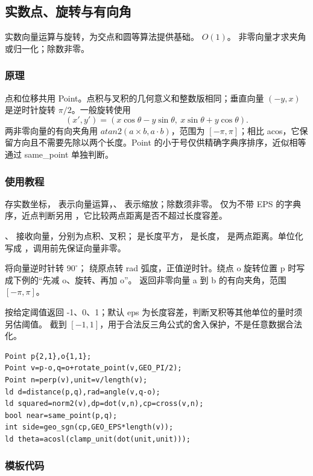 \subsection{实数点、旋转与有向角}
\label{geo:point}
\AlgorithmInfo
    {实数向量运算与旋转，为交点和圆等算法提供基础。}
    {$O(1)$。}
    {非零向量才求夹角或归一化；除数非零。}
\subsubsection*{原理}

点和位移共用 Point。点积与叉积的几何意义和整数版相同；垂直向量 $(-y,x)$ 是逆时针旋转 $\pi/2$。一般旋转使用
\[
 (x',y')=(x\cos\theta-y\sin\theta,\ x\sin\theta+y\cos\theta).
\]
两非零向量的有向夹角用 $atan2(a\times b,a\cdot b)$，范围为 $[-\pi,\pi]$；相比 acos，它保留方向且不需要先除以两个长度。Point 的小于号仅供精确字典序排序，近似相等通过 same\_point 单独判断。

\subsubsection*{使用教程}
 存实数坐标，\InlineCode{+/-} 表示向量运算，、 表示缩放；除数须非零。\InlineCode{<} 仅为不带 EPS 的字典序，近点判断另用 ，它比较两点距离是否不超过长度容差。

、 接收向量，分别为点积、叉积； 是长度平方， 是长度， 是两点距离。单位化写成 ，调用前先保证向量非零。

 将向量逆时针转 $90^\circ$； 绕原点转 rad 弧度，正值逆时针。绕点 o 旋转位置 p 时写成下例的“先减 o、旋转、再加 o”。 返回非零向量 a 到 b 的有向夹角，范围 $[-\pi,\pi]$。

 按给定阈值返回 -1、0、1；默认 eps 为长度容差，判断叉积等其他单位的量时须另估阈值。 截到 $[-1,1]$，用于合法反三角公式的舍入保护，不是任意数据合法化。
\begin{lstlisting}[style=mtycpp,numbers=none]
Point p{2,1},o{1,1};
Point v=p-o,q=o+rotate_point(v,GEO_PI/2);
Point n=perp(v),unit=v/length(v);
ld d=distance(p,q),rad=angle(v,q-o);
ld squared=norm2(v),dp=dot(v,n),cp=cross(v,n);
bool near=same_point(p,q);
int side=geo_sgn(cp,GEO_EPS*length(v));
ld theta=acosl(clamp_unit(dot(unit,unit)));
\end{lstlisting}
\subsubsection*{模板代码}

